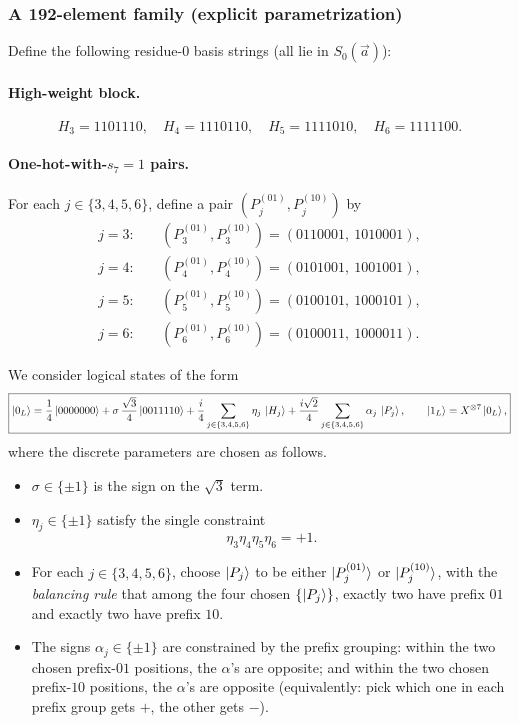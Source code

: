\documentclass[11pt]{article}
\begin{document}
\subsubsection{A 192-element family (explicit parametrization)}

Define the following residue-0 basis strings (all lie in \(S_0(\vec a)\)):

\paragraph{High-weight block.}
\[
H_3=1101110,\quad H_4=1110110,\quad H_5=1111010,\quad H_6=1111100.
\]

\paragraph{One-hot-with-\(s_7=1\) pairs.}
For each \(j\in\{3,4,5,6\}\), define a pair \((P^{(01)}_j,P^{(10)}_j)\) by
\[
\begin{aligned}
j=3:&\quad (P^{(01)}_3,P^{(10)}_3)=(0110001,\ 1010001),\\
j=4:&\quad (P^{(01)}_4,P^{(10)}_4)=(0101001,\ 1001001),\\
j=5:&\quad (P^{(01)}_5,P^{(10)}_5)=(0100101,\ 1000101),\\
j=6:&\quad (P^{(01)}_6,P^{(10)}_6)=(0100011,\ 1000011).
\end{aligned}
\]

We consider logical states of the form
\[
\boxed{
\ket{0_L}=
\frac{1}{4}\ket{0000000}
+\sigma\,\frac{\sqrt3}{4}\ket{0011110}
+\frac{i}{4}\sum_{j\in\{3,4,5,6\}}\eta_j\,\ket{H_j}
+\frac{i\sqrt2}{4}\sum_{j\in\{3,4,5,6\}}\alpha_j\,\ket{P_j},
\qquad
\ket{1_L}=X^{\otimes 7}\ket{0_L},
}
\]
where the discrete parameters are chosen as follows.

\begin{itemize}
\item \(\sigma\in\{\pm 1\}\) is the sign on the \(\sqrt3\) term.
\item \(\eta_j\in\{\pm 1\}\) satisfy the single constraint
\[
\eta_3\eta_4\eta_5\eta_6 = +1.
\]
\item For each \(j\in\{3,4,5,6\}\), choose \(\ket{P_j}\) to be either \(\ket{P^{(01)}_j}\) or \(\ket{P^{(10)}_j}\), with the \emph{balancing rule} that among the four chosen \(\{\ket{P_j}\}\), exactly two have prefix \(01\) and exactly two have prefix \(10\).
\item The signs \(\alpha_j\in\{\pm 1\}\) are constrained by the prefix grouping: within the two chosen prefix-\(01\) positions, the \(\alpha\)'s are opposite; and within the two chosen prefix-\(10\) positions, the \(\alpha\)'s are opposite (equivalently: pick which one in each prefix group gets \(+\), the other gets \(-\)).
\end{itemize}
\end{document}
